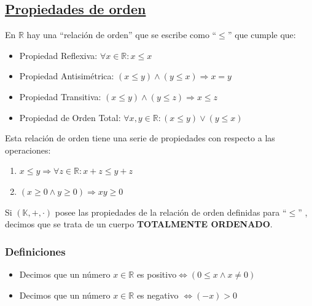 \documentclass[10pt,a4paper,openright]{book}
\theoremstyle{break}
\begin{document}
\subsection{\underline {Propiedades de orden}}
En $\mathbb R$ hay una ``relación de orden'' que se escribe como ``$\leq$'' que cumple que:
\begin{itemize}
\item Propiedad Reflexiva: $\forall x\in  \mathbb R: x \leq x$
\item Propiedad Antisimétrica: $(x\leq y) \wedge (y\leq x) \Rightarrow x=y$
\item Propiedad Transitiva: $(x\leq y) \wedge (y \leq z) \Rightarrow x\leq z$
\item Propiedad de Orden Total: $\forall x,y\in \mathbb R: (x\leq y) \vee (y\leq x)$
\end{itemize}
Esta relación de orden tiene una serie de propiedades con respecto a las operaciones:
\begin{enumerate}
\item $x\leq y \Rightarrow \forall z \in \mathbb R : x+z\leq y+z$
\item $(x\geq 0 \wedge y \geq 0)\Rightarrow xy\geq 0$
\end{enumerate}

Si $(\mathbb K, +, \cdot)$ posee las propiedades de la relación de orden definidas para ``$\leq$'' , decimos que se trata de un cuerpo \textbf{TOTALMENTE ORDENADO}.

\subsubsection{Definiciones}
\begin{itemize}
\item Decimos que un número $x\in \mathbb R$ es positivo$\Leftrightarrow (0\leq x \wedge x\neq 0)$
\item Decimos que un número $x\in \mathbb R$ es negativo $\Leftrightarrow (-x)>0$
\end{itemize}
\end{document}
